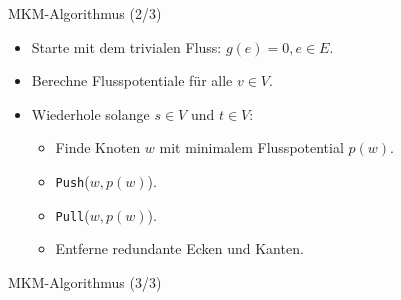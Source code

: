 \documentclass[aspectratio=169]{beamer}
\begin{document}
\begin{frame}{MKM-Algorithmus (2/3)}

  \begin{algorithmus*}
    \begin{itemize}
      \item Starte mit dem trivialen Fluss: $g(e) = 0 , e \in E$.
      \item Berechne Flusspotentiale für alle $v \in V$.
      \item Wiederhole solange $s \in V$ und $t \in V$:
      \begin{itemize}
        \item Finde Knoten $w$ mit minimalem Flusspotential $p(w)$.
        \item \texttt{Push}($w,p(w)$).
        \item \texttt{Pull}($w,p(w)$).
        \item Entferne redundante Ecken und Kanten.
      \end{itemize}
    \end{itemize}
  \end{algorithmus*}
  
\end{frame}

\begin{frame}{MKM-Algorithmus (3/3)}

  {\small
  \begin{algorithmus*}
    \begin{algorithm}[H]
      \begin{algorithmic}
          \EndProcedure
      \end{algorithmic}
    \end{algorithm}
  \end{algorithmus*}
  }

\end{frame}
\end{document}
